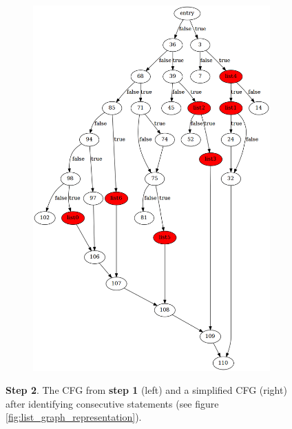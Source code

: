 \begin{figure}[htbp]
\begin{subfigure}[ht]{0.45\textwidth}
		\includegraphics[width=\textwidth]{inc/appendices/control_flow_analysis_example/step2_after.png}
	\end{subfigure}
	\caption{\textbf{Step 2}. The CFG from \textbf{step 1} (left) and a simplified CFG (right) after identifying consecutive statements (see figure \ref{fig:list_graph_representation}).}
	\label{fig:step_2}
\end{figure}

